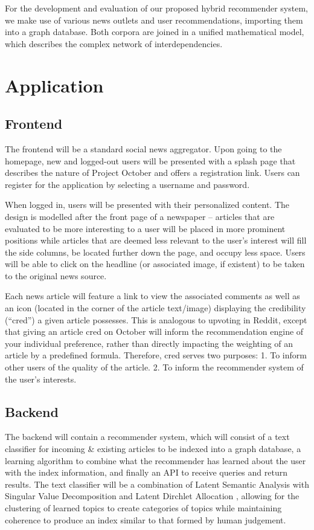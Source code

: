 \documentclass[11pt,letterpaper]{article}
\begin{document}
For the development and evaluation of our proposed hybrid recommender system, we make use of various news outlets and user recommendations, importing them into a graph database.
Both corpora are joined in a unified mathematical model, which describes the complex network of interdependencies.

\section{Application}
\subsection{Frontend}
The frontend will be a standard social news aggregator.
Upon going to the homepage, new and logged-out users will be presented with a splash page that describes the nature of Project October and offers a registration link.
Users can register for the application by selecting a username and password.

When logged in, users will be presented with their personalized content.
The design is modelled after the front page of a newspaper -- articles that are evaluated to be more interesting to a user will be placed in more prominent positions while articles that are deemed less relevant to the user's interest will fill the side columns, be located further down the page, and occupy less space.
Users will be able to click on the headline (or associated image, if existent) to be taken to the original news source.

Each news article will feature a link to view the associated comments as well as an icon (located in the corner of the article text/image) displaying the credibility (``cred'') a given article possesses.
This is analogous to upvoting in Reddit, except that giving an article cred on October will inform the recommendation engine of your individual preference, rather than directly impacting the weighting of an article by a predefined formula. Therefore, cred serves two purposes: 1. To inform other users of the quality of the article. 2. To inform the recommender system of the user's interests. 

\subsection{Backend}

The backend will contain a recommender system, which will consist of a text
classifier for incoming \& existing articles to be indexed into a graph
database, a learning algorithm to combine what the recommender has learned about
the user with the index information, and finally an API to receive queries and
return results. The text classifier will be a combination of Latent Semantic
Analysis with Singular Value Decomposition and Latent Dirchlet Allocation
\cite{lda}, allowing for the clustering of learned topics to create categories
of topics while maintaining coherence to produce an index similar to that formed
by human judgement. 
\end{document}
